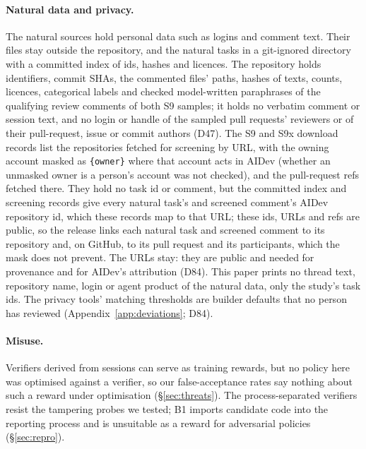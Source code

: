 \paragraph{Natural data and privacy.} The natural sources hold personal data such as logins and comment text. Their files stay outside the repository, and the natural tasks in a git-ignored directory with a committed index of ids, hashes and licences. The repository holds identifiers, commit SHAs, the commented files' paths, hashes of texts, counts, licences, categorical labels and checked model-written paraphrases of the qualifying review comments of both S9 samples; it holds no verbatim comment or session text, and no login or handle of the sampled pull requests' reviewers or of their pull-request, issue or commit authors (D47). The S9 and S9x download records list the repositories fetched for screening by URL, with the owning account masked as \texttt{\{owner\}} where that account acts in AIDev (whether an unmasked owner is a person's account was not checked), and the pull-request refs fetched there. They hold no task id or comment, but the committed index and screening records give every natural task's and screened comment's AIDev repository id, which these records map to that URL; these ids, URLs and refs are public, so the release links each natural task and screened comment to its repository and, on GitHub, to its pull request and its participants, which the mask does not prevent. The URLs stay: they are public and needed for provenance and for AIDev's attribution (D84). This paper prints no thread text, repository name, login or agent product of the natural data, only the study's task ids. The privacy tools' matching thresholds are builder defaults that no person has reviewed (Appendix~\ref{app:deviations}; D84).

\paragraph{Misuse.} Verifiers derived from sessions can serve as training rewards, but no policy here was optimised against a verifier, so our false-acceptance rates say nothing about such a reward under optimisation (\S\ref{sec:threats}). The process-separated verifiers resist the tampering probes we tested; B1 imports candidate code into the reporting process and is unsuitable as a reward for adversarial policies (\S\ref{sec:repro}).

